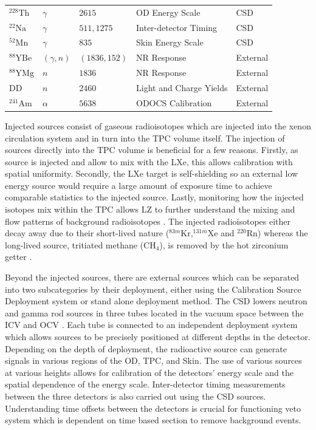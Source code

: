 \begin{table}[!ht]
\begin{tabular}{lllll}
         $^{228}\text{Th}$& $\gamma$ & $2615$ &OD Energy Scale & CSD\\
         $^{22}\text{Na}$& $\gamma$ & $511, 1275$ &Inter-detector Timing & CSD\\
         $^{52}\text{Mn}$& $\gamma$ & $835$ &Skin Energy Scale & CSD\\
         $^{88}\text{YBe}$& $(\gamma,n)$ & $(1836,152)$ &NR Response & External\\
         $^{88}\text{YMg}$& $n$ & $1836$ & NR Response & External\\
         DD& $n$ & $2460$ & Light and Charge Yields & External\\
         $^{241}\text{Am}$& $\alpha$ & $5638$ &ODOCS Calibration & External\\
         \hline\hline
    \end{tabular}
    \label{tab:LZ/CalibrationSources}
\end{table}
Injected sources consist of gaseous radioisotopes which are injected into the xenon circulation system and in turn into the TPC volume itself. The injection of sources directly into the TPC volume is beneficial for a few reasons. Firstly, as source is injected and allow to mix with the LXe, this allows calibration with spatial uniformity. Secondly, the LXe target is self-shielding so an external low energy source would require a large amount of exposure time to achieve comparable statistics to the injected source. Lastly, monitoring how the injected isotopes mix within the TPC allows LZ to further understand the mixing and flow patterns of background radioisotopes \cite{LZ:2024bsz}. The injected radioisotopes either decay away due to their short-lived nature ($^{83m}\text{Kr}$,$^{131m}\text{Xe}$ and $^{220}\text{Rn}$) whereas the long-lived source, tritiated methane ($\text{CH}_4$), is removed by the hot zirconium getter \cite{LZNIMA}.

Beyond the injected sources, there are external sources which can be separated into two subcategories by their deployment, either using the Calibration Source Deployment system or stand alone deployment method. The CSD lowers neutron and gamma rod sources in three tubes located in the vacuum space between the ICV and OCV \cite{LZNIMA}. Each tube is connected to an independent deployment system which allows sources to be precisely positioned at different depths in the detector. Depending on the depth of deployment, the radioactive source can generate signals in various regions of the OD, TPC, and Skin. The use of various sources at various heights allows for calibration of the detectors' energy scale and the spatial dependence of the energy scale. Inter-detector timing measurements between the three detectors is also carried out using the CSD sources. Understanding time offsets between the detectors is crucial for functioning veto system which is dependent on time based section to remove background events.

